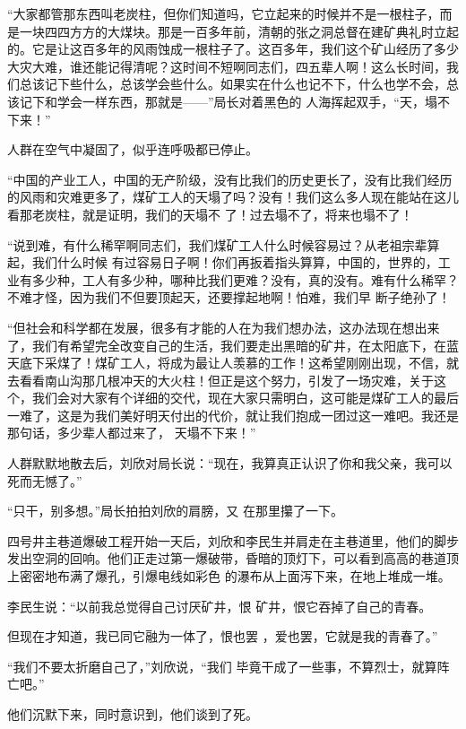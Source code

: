 \documentclass{article}
\begin{document}
\newpage

“大家都管那东西叫老炭柱，但你们知道吗，它立起来的时候并不是一根柱子，而是一块四四方方的大煤块。那是一百多年前，清朝的张之洞总督在建矿典礼时立起的。它是让这百多年的风雨蚀成一根柱子了。这百多年，我们这个矿山经历了多少大灾大难，谁还能记得清呢？这时间不短啊同志们，四五辈人啊！这么长时间，我们总该记下些什么，总该学会些什么。如果实在什么也记不下，什么也学不会，总该记下和学会一样东西，那就是——”局长对着黑色的
人海挥起双手，“天，塌不下来！” 

人群在空气中凝固了，似乎连呼吸都已停止。

“中国的产业工人，中国的无产阶级，没有比我们的历史更长了，没有比我们经历的风雨和灾难更多了，煤矿工人的天塌了吗？没有！我们这么多人现在能站在这儿看那老炭柱，就是证明，我们的天塌不
了！过去塌不了，将来也塌不了！ 

“说到难，有什么稀罕啊同志们，我们煤矿工人什么时候容易过？从老祖宗辈算起，我们什么时候
\newpage
有过容易日子啊！你们再扳着指头算算，中国的，世界的，工业有多少种，工人有多少种，哪种比我们更难？没有，真的没有。难有什么稀罕？不难才怪，因为我们不但要顶起天，还要撑起地啊！怕难，我们早
断子绝孙了！ 

“但社会和科学都在发展，很多有才能的人在为我们想办法，这办法现在想出来了，我们有希望完全改变自己的生活，我们要走出黑暗的矿井，在太阳底下，在蓝天底下采煤了！煤矿工人，将成为最让人羡慕的工作！这希望刚刚出现，不信，就去看看南山沟那几根冲天的大火柱！但正是这个努力，引发了一场灾难，关于这个，我们会对大家有个详细的交代，现在大家只需明白，这可能是煤矿工人的最后一难了，这是为我们美好明天付出的代价，就让我们抱成一团过这一难吧。我还是那句话，多少辈人都过来了，
天塌不下来！” 

人群默默地散去后，刘欣对局长说：“现在，我算真正认识了你和我父亲，我可以死而无憾了。”

\newpage

“只干，别多想。”局长拍拍刘欣的肩膀，又
在那里攥了一下。 


四号井主巷道爆破工程开始一天后，刘欣和李民生并肩走在主巷道里，他们的脚步发出空洞的回响。他们正走过第一爆破带，昏暗的顶灯下，可以看到高高的巷道顶上密密地布满了爆孔，引爆电线如彩色
的瀑布从上面泻下来，在地上堆成一堆。 

李民生说：“以前我总觉得自己讨厌矿井，恨
矿井，恨它吞掉了自己的青春。 

但现在才知道，我已同它融为一体了，恨也罢
，爱也罢，它就是我的青春了。” 

“我们不要太折磨自己了，”刘欣说，“我们
毕竟干成了一些事，不算烈士，就算阵亡吧。” 

他们沉默下来，同时意识到，他们谈到了死。
\end{document}
